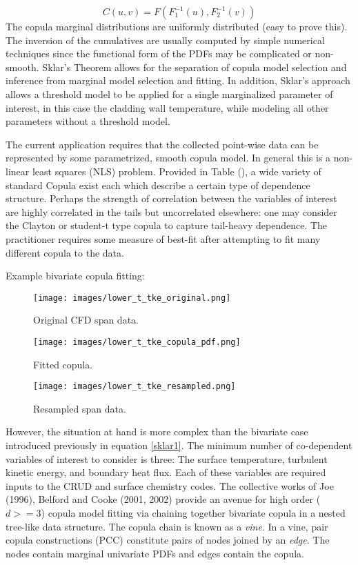 \documentclass[10pt,a4paper]{report}
\begin{document}
\begin{equation}
C(u, v) = F(F_1^{-1}(u), F_2^{-1}(v))
\label{sklar2}
\end{equation}
The copula marginal distributions are uniformly distributed (easy to prove this).  The inversion of the cumulatives are usually computed by simple numerical techniques since the functional form of the PDFs may be complicated or non-smooth.  Sklar's Theorem allows for the separation of copula model selection and inference from marginal model selection and fitting. In addition, Sklar's approach allows a threshold model to be applied for a single marginalized parameter of interest, in this case the cladding wall temperature, while modeling all other parameters without a threshold model.  

The current application requires that the collected point-wise data can be represented by some parametrized, smooth copula model.  In general this is a non-linear least squares (NLS) problem.  Provided in Table (), a wide variety of standard Copula exist each which describe a certain type of dependence structure.  Perhaps the strength of correlation between the variables of interest are highly correlated in the tails but uncorrelated elsewhere:  one may consider the Clayton or student-t type copula to capture tail-heavy dependence.  The practitioner requires some measure of best-fit after attempting to fit many different copula to the data.

Example bivariate copula fitting:
\begin{figure}[hbtp]
\centering
\texttt{[image: images/lower\_t\_tke\_original.png]}
\caption{Original CFD span data.}
\label{tri_var}
\end{figure}

\begin{figure}[hbtp]
\centering
\texttt{[image: images/lower\_t\_tke\_copula\_pdf.png]}
\caption{Fitted copula.}
\label{tri_var}

\end{figure}
\begin{figure}[hbtp]
\centering
\texttt{[image: images/lower\_t\_tke\_resampled.png]}
\caption{Resampled span data.}
\label{tri_var}
\end{figure}


However, the situation at hand is more complex than the bivariate case introduced previously in equation \ref{sklar1}.  The minimum number of co-dependent variables of interest to consider is three:  The surface temperature, turbulent kinetic energy, and boundary heat flux.  Each of these variables are required inputs to the CRUD and surface chemistry codes.  The collective works of Joe (1996), Belford and Cooke (2001, 2002) provide an avenue for high order ($d>=3$) copula model fitting via chaining together bivariate copula in a nested tree-like data structure.  The copula chain is known as a \emph{vine}. In a vine, pair copula constructions (PCC) constitute pairs of nodes joined by an \emph{edge}.  The nodes contain marginal univariate PDFs and edges contain the copula.
\end{document}
